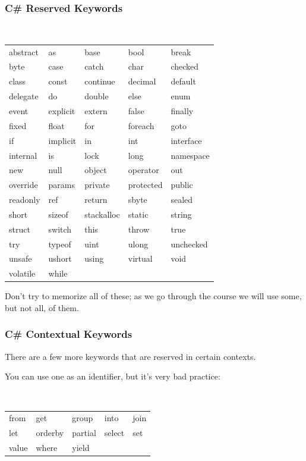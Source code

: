 \begin{frame}
\frametitle{C\# Reserved Keywords}
{\small\tt
\begin{center}
\begin{tabular}{l l l l l}
abstract & as & base & bool & break\\
byte & case & catch & char & checked\\
class & const & continue & decimal & default\\
delegate & do & double & else & enum\\
event & explicit & extern & false & finally\\
fixed & float & for & foreach & goto\\
if & implicit & in & int & interface\\
internal & is & lock & long & namespace\\
new & null & object & operator & out\\
override & params & private & protected & public\\
readonly & ref & return & sbyte & sealed\\
short & sizeof & stackalloc & static & string\\
struct & switch & this & throw & true\\
try & typeof & uint & ulong & unchecked\\
unsafe & ushort & using & virtual & void\\
volatile & while & & & \\
\end{tabular}
\end{center}
}
Don't try to memorize all of these; as we go through the course we will use some, but not all, of them.
\end{frame}

\begin{frame}
\frametitle{C\# Contextual Keywords}

There are a few more keywords that are reserved in certain contexts.

You can use one as an identifier, but it's very bad practice:

{\small\tt
\begin{center}
\begin{tabular}{l l l l l}
from & get & group & into & join\\
let & orderby & partial & select & set\\
value & where & yield &  & \\
\end{tabular}
\end{center}
}
\end{frame}


